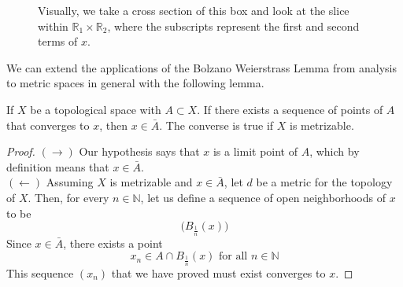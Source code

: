   \begin{figure}[H]
    \centering 
    \caption{Visually, we take a cross section of this box and look at the slice within $\mathbb{R}_1 \times \mathbb{R}_2$, where the subscripts represent the first and second terms of $x$.}
    \label{fig:cross_sec}
  \end{figure}

  We can extend the applications of the Bolzano Weierstrass Lemma from analysis to metric spaces in general with the following lemma. 

  \begin{lemma}
    If $X$ be a topological space with $A \subset X$. If there exists a sequence of points of $A$ that converges to $x$, then $x \in \bar{A}$. The converse is true if $X$ is metrizable. 
  \end{lemma}
  \begin{proof}
    $(\rightarrow)$ Our hypothesis says that $x$ is a limit point of $A$, which by definition means that $x \in \bar{A}$. \\
    $(\leftarrow)$ Assuming $X$ is metrizable and $x \in \bar{A}$, let $d$ be a metric for the topology of $X$. Then, for every $n \in \mathbb{N}$, let us define a sequence of open neighborhoods of $x$ to be
    \begin{equation}
      \big(B_{\frac{1}{n}} (x) \big)
    \end{equation}
    Since $x \in \bar{A}$, there exists a point 
    \begin{equation}
      x_n \in A \cap B_{\frac{1}{n}} (x) \text{ for all } n \in \mathbb{N}
    \end{equation}
    This sequence $(x_n)$ that we have proved must exist converges to $x$. 
  \end{proof}


